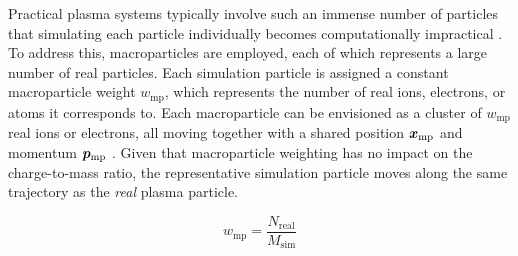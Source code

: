 Practical plasma systems typically involve such an immense number of particles that simulating each particle individually becomes computationally impractical \cite{brieda_plasma_2019}. To address this, macroparticles are employed, each of which represents a large number of real particles. Each simulation particle is assigned a constant macroparticle weight $w_\mathrm{mp}$, which represents the number of real ions, electrons, or atoms it corresponds to. Each macroparticle can be envisioned as a cluster of $w_\mathrm{mp}$ real ions or electrons, all moving together with a shared position $\bm{x}_\mathrm{mp}$ and momentum $\bm{p}_\mathrm{mp}$ \cite{wu_particle--cell_2018}. Given that macroparticle weighting has no impact on the charge-to-mass ratio, the representative simulation particle moves along the same trajectory as the \textit{real} plasma particle.

\begin{equation}
    w_\mathrm{mp} = \frac{N_\mathrm{real}}{M_\mathrm{sim}}
\end{equation}


